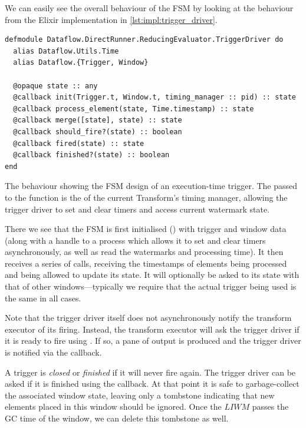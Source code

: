 We can easily see the overall behaviour of the FSM by looking at the  behaviour from the Elixir implementation in \cref{lst:impl:trigger_driver}.

\begin{listing}[h]
	\begin{verbatim}
defmodule Dataflow.DirectRunner.ReducingEvaluator.TriggerDriver do
  alias Dataflow.Utils.Time
  alias Dataflow.{Trigger, Window}
  
  @opaque state :: any
  @callback init(Trigger.t, Window.t, timing_manager :: pid) :: state
  @callback process_element(state, Time.timestamp) :: state
  @callback merge([state], state) :: state
  @callback should_fire?(state) :: boolean
  @callback fired(state) :: state
  @callback finished?(state) :: boolean
end
	\end{verbatim}
\caption[The  behaviour showing the Finite State Machine design of an execution-time trigger.]{The  behaviour showing the FSM design of an execution-time trigger. The  passed to the  function is the  of the current Transform's timing manager, allowing the trigger driver to set and clear timers and access current watermark state.}
\label{lst:impl:trigger_driver}
\end{listing}


There we see that the FSM is first initialised () with trigger and window data (along with a handle to a process which allows it to set and clear timers asynchronously, as well as read the watermarks and processing time).
It then receives a series of  calls, receiving the timestamps of elements being processed and being allowed to update its state.
It will optionally be asked to  its state with that of other windows---typically we require that the actual trigger being used is the same in all cases.

Note that the trigger driver itself does not asynchronously notify the transform executor of its firing.
Instead, the transform executor will ask the trigger driver if it is ready to fire using .
If so, a pane of output is produced and the trigger driver is notified via the  callback.

A trigger is \emph{closed} or \emph{finished} if it will never fire again.
The trigger driver can be asked if it is finished using the  callback.
At that point it is safe to garbage-collect the associated window state, leaving only a tombstone indicating that new elements placed in this window should be ignored.
Once the $\mathit{LIWM}$ passes the GC time of the window, we can delete this tombstone as well.

